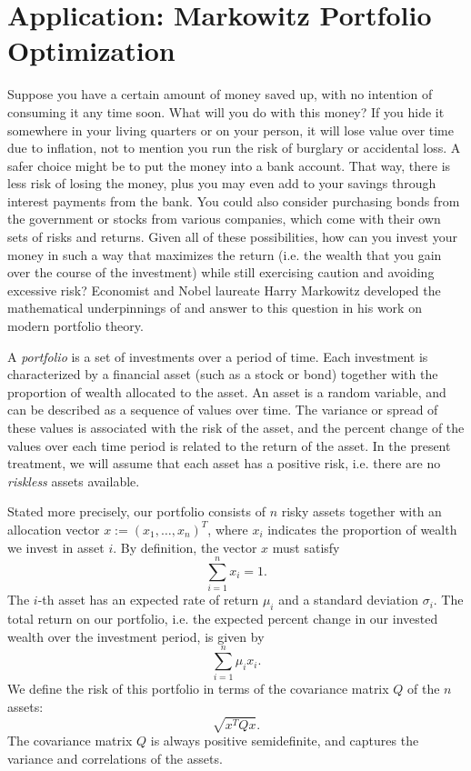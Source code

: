 \section*{Application: Markowitz Portfolio Optimization}
Suppose you have a certain amount of money saved up, with no intention of consuming it any time soon.
What will you do with this money? If you hide it somewhere in your living quarters or on your person,
it will lose value over time due to inflation, not to mention you run the risk of burglary or accidental
loss. A safer choice might be to put the money into a bank account. That way, there is less risk of losing the
money, plus you may even add to your savings through interest payments from the bank. You could also
consider purchasing bonds from the government or stocks from various companies, which come with their own
sets of risks and returns. Given all of these possibilities, how can you invest your money in such a way
that maximizes the return (i.e. the wealth that you gain over the course of the investment) while still
exercising caution and avoiding excessive risk? Economist and Nobel laureate Harry Markowitz developed
the mathematical underpinnings of and answer to this question in his work on modern portfolio theory.

A \emph{portfolio} is a set of investments over a period of time. Each
investment is characterized by a financial asset (such as a stock or bond) together with the proportion of
wealth allocated to the asset. An asset is a random variable, and can be described as a sequence of values over time.
The variance or spread of these values is associated with the risk of the asset, and the percent change of the values
over each time period is related to the return of the asset.
In the present treatment, we will assume that each asset has a positive risk, i.e.
there are no \emph{riskless} assets available.

Stated more precisely, our portfolio consists of $n$ risky assets together with an allocation vector
$x := (x_1,\ldots,x_n)^T$, where $x_i$ indicates the proportion of wealth we invest in
asset $i$. By definition, the vector $x$ must satisfy
\[
\sum_{i=1}^n x_i = 1.
\]
The $i$-th asset has an expected rate of return $\mu_i$ and a standard deviation $\sigma_i$.
The total return on our portfolio, i.e. the expected percent change in our invested wealth over the investment period,
is given by
\[
\sum_{i=1}^n \mu_ix_i.
\]
We define the risk of this portfolio in terms of the covariance matrix $Q$ of the $n$ assets:
\[
\sqrt{x^T Q x}.
\]
The covariance matrix $Q$ is always positive semidefinite, and captures the variance and correlations of the assets.

